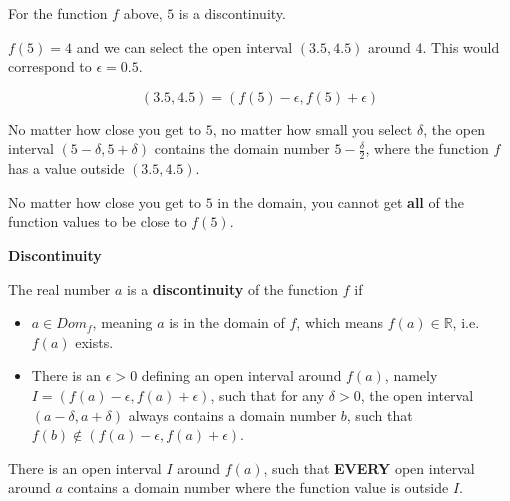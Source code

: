 \documentclass{ximera}
\begin{document}
\begin{observation}

For the function $f$ above, $5$ is a discontinuity. 


$f(5) = 4$ and we can select the open interval $(3.5, 4.5)$ around $4$.   This would correspond to $\epsilon = 0.5$.

\[   (3.5, 4.5) = (f(5) - \epsilon, f(5) + \epsilon)    \]


No matter how close you get to $5$, no matter how small you select $\delta$, the open interval $(5 - \delta, 5 + \delta)$ contains the domain number $5-\frac{\delta}{2}$, where the function $f$ has a value outside $(3.5, 4.5)$.


No matter how close you get to $5$ in the domain, you cannot get \textbf{\textcolor{blue!55!black}{all}} of the function values to be close to $f(5)$.

\end{observation}



















\begin{definition} \textbf{\textcolor{green!50!black}{Discontinuity}}

The real number $a$ is a \textbf{discontinuity} of the function $f$ if

\begin{itemize}
\item $a \in Dom_f$, meaning $a$ is in the domain of $f$, which means $f(a) \in \mathbb{R}$, i.e. $f(a)$ exists.
\item There is an $\epsilon > 0$ defining an open interval around $f(a)$, namely $I = (f(a) - \epsilon, f(a) + \epsilon)$, such that for any $\delta > 0$, the open interval $(a - \delta, a + \delta)$ always contains a domain number $b$, such that $f(b) \not\in(f(a)-\epsilon, f(a)+\epsilon)$.
\end{itemize}

There is an open interval $I$ around $f(a)$, such that \textbf{\textcolor{purple!85!blue}{EVERY}} open interval around $a$ contains a domain number where the function value is outside $I$.

\end{definition}
\end{document}
